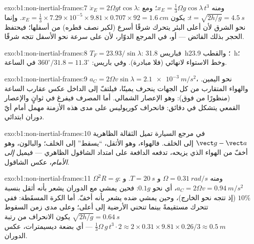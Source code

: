 \begin{solution}{exo:b1:non-inertial-frames:7}
$\ddot x_E = 2\Omega gt\cos\lambda$: ومنه $x_E = \tfrac13\Omega g\cos\lambda\,t^3$؛ ومع $t =
\sqrt{2h/g} = \qty{4.5}{s}$: يكون $x_E = \tfrac13 \times 7.29\times10^{-5} \times 9.81
\times 0.707 \times 92 = \qty{1.6}{cm}$. وإنما نحو الشرق لأن أعلى البئر
يتحرك شرقًا أسرع (لكبر نصف قطره) من أسفلها؛ فيحتفظ الحجر بذلك
الفائض --- أو، في المرجع الدوّار، لأن  على سرعة نحو الأسفل تتجه شرقًا.
\end{solution}

\begin{solution}{exo:b1:non-inertial-frames:8}
$T_F = 23.93/\sin\lambda$: فباريس \qty{31.8}{h}؛ والقطب \qty{23.9}{h}؛ وخط الاستواء
لانهائي (فلا مبادرة). وفي باريس: $360^\circ/31.8 = 11.3^\circ$ في الساعة.
\end{solution}

\begin{solution}{exo:b1:non-inertial-frames:9}
$a_C = 2\Omega v\sin\lambda = \qty{2.1e-3}{m/s^2}$، نحو اليمين. والهواء
المتقارب من كل الجهات ينحرف يمينًا، فيلتفّ إلى الداخل
عكس عقارب الساعة (منظورًا من فوق): وهو الإعصار الشمالي. أما المصرف فيفرغ
في ثوانٍ والإعصار القمعي يتشكل في دقائق: فانحراف كوريوليس على مدى
هذه الأزمنة مهمل أمام أيّ دوران ابتدائي.
\end{solution}

\begin{solution}{exo:b1:non-inertial-frames:10}
في مرجع السيارة تميل الثقالة الظاهرية $\vect g - \vect a$ إلى الخلف.
فالهواء، وهو الأثقل، ``يسقط'' إلى الخلف؛ والبالون، وهو أخفّ من الهواء الذي
يزيحه، تدفعه الدافعة على امتداد الشاقول الظاهري --- فيميل \emph{إلى الأمام}،
عكس الشاقول.
\end{solution}

\begin{solution}{exo:b1:non-inertial-frames:11}
$\Omega^2R = g$: ومنه $\Omega = \qty{0.31}{rad/s}$ و $T = \qty{20}{s}$. و $a_C = 2\Omega v
= \qty{0.94}{m/s^2}$، أي نحو $0.1g$: فحين يمشي مع الدوران يشعر
بأنه أثقل بنسبة $10\%$ (إذ تتجه  نحو الخارج)، وحين يمشي ضده يشعر
بأنه أخفّ. أما الكرة المسقَطة: ففي  تتحرك مستقيمةً بينما
تنحني الأرضية إلى أعلى؛ وعلى مدى زمن السقوط $\sqrt{2h/g} = \qty{0.64}{s}$ يكون
الانحراف من رتبة $\tfrac13\Omega\,g\,t^3 \cdot 2 \approx 2 \times 0.31 \times
9.81 \times 0.26/3 \approx \qty{0.5}{m}$ --- أي بضعة ديسيمترات، عكس
الدوران.
\end{solution}

